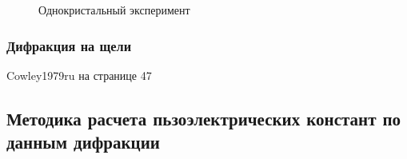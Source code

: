 \begin{figure}[H]
  \centering
  \hfill
  \caption{Однокристальный эксперимент}
  \label{ris:zero_exp}
\end{figure}


   \subsubsection{Дифракция на щели}
      Cowley1979ru на странице 47
  

\subsection{Методика расчета пьзоэлектрических констант по данным дифракции}
